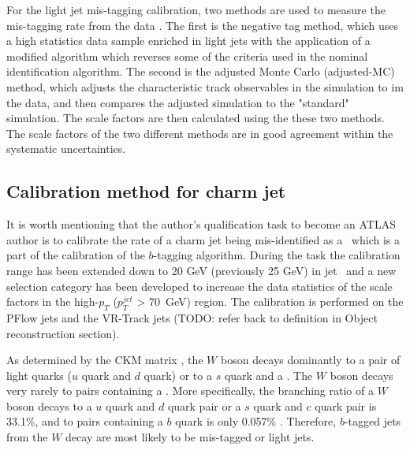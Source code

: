 \documentclass[letterpaper,12pt]{article}
\begin{document}
For the light jet mis-tagging calibration, two methods are 
used to measure the mis-tagging rate from the data \cite{ATLAS-CONF-2018-006}. 
The first is the negative tag method, which uses a high statistics data sample enriched 
in light jets with the application of a modified algorithm which 
reverses some of the criteria used in the nominal identification 
algorithm.
The second is the adjusted Monte Carlo (adjusted-MC) method, which 
adjusts the characteristic track observables in the simulation 
to im the data, and then compares the adjusted simulation to the 
"standard" simulation. The scale factors are then calculated using 
the these two methods. The scale factors of the two different methods 
are in good agreement within the systematic uncertainties. 



\subsection{Calibration method for charm jet}
\label{sec:Calibration method for charm jet}

It is worth mentioning that the author's qualification task to become an ATLAS author is to 
calibrate the rate of a charm jet being mis-identified as a \bjet\, which is a part 
of the calibration of the $b$-tagging algorithm.
During the task the calibration range has been extended down to 20 GeV (previously 25 GeV) in
jet \pt\ and a new selection category has been developed 
to increase the data statistics of the scale factors in the 
high-$p_T$ ($p_T^{jet}$ > 70~GeV) region.
The calibration is performed on the PFlow jets and the VR-Track jets (TODO: refer back to definition in Object reconstruction section). 

As determined by the CKM matrix \cite{CKM1,CKM2}, the $W$ boson decays dominantly to 
a pair of light quarks ($u$ quark and $d$ quark) or to
a $s$ quark and a \cquark. The $W$ boson decays very rarely to pairs containing a \bquark. 
More specifically, the branching ratio of a $W$ boson decays to a $u$ quark and $d$ quark pair or 
a $s$ quark and $c$ quark pair is 33.1\%, and to pairs containing a $b$ quark is only 0.057\% \cite{PDG}. 
Therefore, $b$-tagged jets from the $W$ decay are most likely 
to be mis-tagged \cjets or light jets. 
\end{document}
